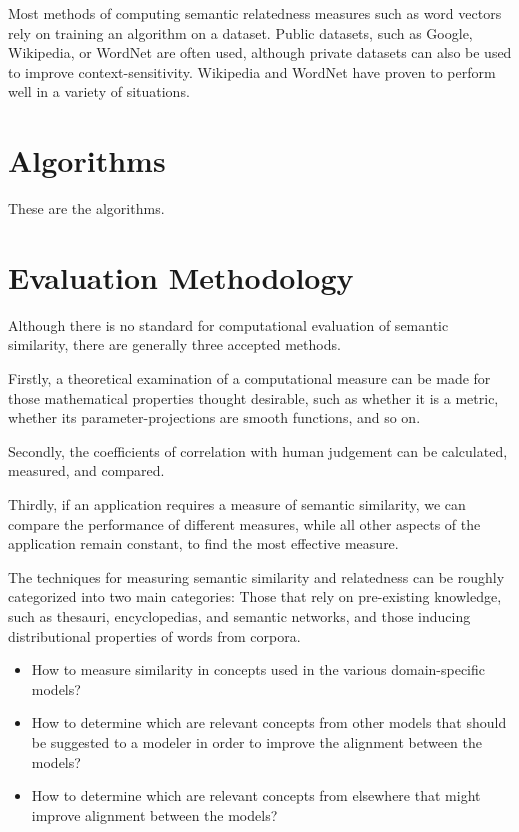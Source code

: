 \documentclass{article}
\begin{document}
Most methods of computing semantic relatedness measures such as word vectors rely on training an algorithm on a dataset. Public datasets, such as Google, Wikipedia, or WordNet are often used, although private datasets can also be used to improve context-sensitivity. Wikipedia and WordNet have proven to perform well in a variety of situations.\cite{strube2006wikirelate}

\section{Algorithms}

These are the algorithms.

\section{Evaluation Methodology}

Although there is no standard for computational evaluation of semantic similarity, there are generally three accepted methods.\cite{meng2013review}

Firstly, a theoretical examination of a computational measure can be made for those mathematical properties thought desirable, such as whether it is a metric, whether its parameter-projections are smooth functions, and so on. %

Secondly, the coefficients of correlation with human judgement can be calculated, measured, and compared.\cite{zhou2008new,seco2004intrinsic}

Thirdly, if an application requires a measure of semantic similarity, we can compare the performance of different measures, while all other aspects of the application remain constant, to find the most effective measure.\cite{blanchard2006tree,budanitsky2006evaluating}

The techniques for measuring semantic similarity and relatedness can be roughly categorized into two main categories:\cite{agirre2009study} Those that rely on pre-existing knowledge, such as thesauri, encyclopedias, and semantic networks,\cite{alvarez2007graph,yang2005measuring,hughes2007lexical} and those inducing distributional properties of words from corpora.\cite{sahami2006web,chen2006novel,bollegala2007measuring}


\begin{itemize}
\item How to measure similarity in concepts used in the various domain-specific models?
\item How to determine which are relevant concepts from other models that should be suggested to a modeler in order to improve the alignment between the models?
\item How to determine which are relevant concepts from elsewhere that might improve alignment between the models?
\end{itemize}
\end{document}
